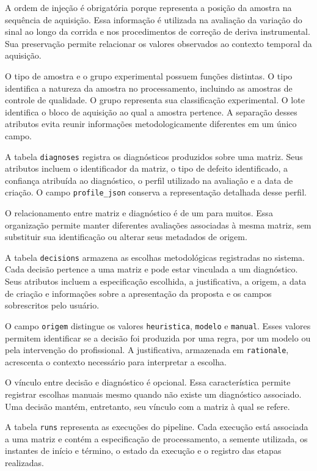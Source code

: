 A ordem de injeção é obrigatória porque representa a posição da amostra na sequência de aquisição. Essa informação é utilizada na avaliação da variação do sinal ao longo da corrida e nos procedimentos de correção de deriva instrumental. Sua preservação permite relacionar os valores observados ao contexto temporal da aquisição.

O tipo de amostra e o grupo experimental possuem funções distintas. O tipo identifica a natureza da amostra no processamento, incluindo as amostras de controle de qualidade. O grupo representa sua classificação experimental. O lote identifica o bloco de aquisição ao qual a amostra pertence. A separação desses atributos evita reunir informações metodologicamente diferentes em um único campo.

A tabela \texttt{diagnoses} registra os diagnósticos produzidos sobre uma matriz. Seus atributos incluem o identificador da matriz, o tipo de defeito identificado, a confiança atribuída ao diagnóstico, o perfil utilizado na avaliação e a data de criação. O campo \texttt{profile\_json} conserva a representação detalhada desse perfil.

O relacionamento entre matriz e diagnóstico é de um para muitos. Essa organização permite manter diferentes avaliações associadas à mesma matriz, sem substituir sua identificação ou alterar seus metadados de origem.

A tabela \texttt{decisions} armazena as escolhas metodológicas registradas no sistema. Cada decisão pertence a uma matriz e pode estar vinculada a um diagnóstico. Seus atributos incluem a especificação escolhida, a justificativa, a origem, a data de criação e informações sobre a apresentação da proposta e os campos sobrescritos pelo usuário.

O campo \texttt{origem} distingue os valores \texttt{heuristica}, \texttt{modelo} e \texttt{manual}. Esses valores permitem identificar se a decisão foi produzida por uma regra, por um modelo ou pela intervenção do profissional. A justificativa, armazenada em \texttt{rationale}, acrescenta o contexto necessário para interpretar a escolha.

O vínculo entre decisão e diagnóstico é opcional. Essa característica permite registrar escolhas manuais mesmo quando não existe um diagnóstico associado. Uma decisão mantém, entretanto, seu vínculo com a matriz à qual se refere.

A tabela \texttt{runs} representa as execuções do pipeline. Cada execução está associada a uma matriz e contém a especificação de processamento, a semente utilizada, os instantes de início e término, o estado da execução e o registro das etapas realizadas.

